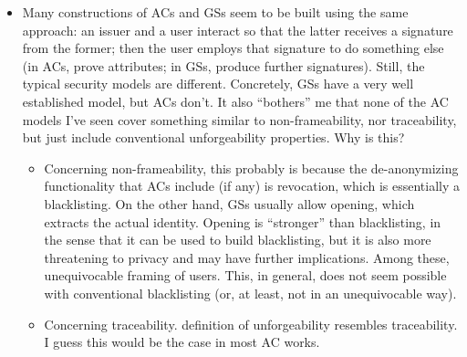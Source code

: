 \documentclass{llncs}%
\begin{document}
\begin{itemize}
\item Many constructions of ACs and GSs seem to be built using the same
  approach: an issuer and a user interact so that the latter receives a signature
  from the former; then the user employs that signature to do something else (in
  ACs, prove attributes; in GSs, produce further signatures). Still, the typical
  security models are different. Concretely, GSs have a very well established
  model, but ACs don't. It also ``bothers'' me that none of the AC models I've
  seen cover something similar to non-frameability, nor traceability, but just
  include conventional unforgeability properties. Why is this?
  \begin{itemize}
  \item Concerning non-frameability, this probably is because the de-anonymizing
    functionality that ACs include (if any) is revocation, which is essentially
    a blacklisting. On the other hand, GSs usually allow opening, which extracts
    the actual identity. Opening is ``stronger'' than blacklisting, in the sense
    that it can be used to build blacklisting, but it is also more threatening
    to privacy and may have further implications. Among these, unequivocable
    framing of users. This, in general, does not seem possible with conventional
    blacklisting (or, at least, not in an unequivocable way).
  \item Concerning traceability. \cite{fhs19} definition of unforgeability
    resembles traceability. I guess this would be the case in most AC works.
  \end{itemize}
\end{itemize}



\end{document}
